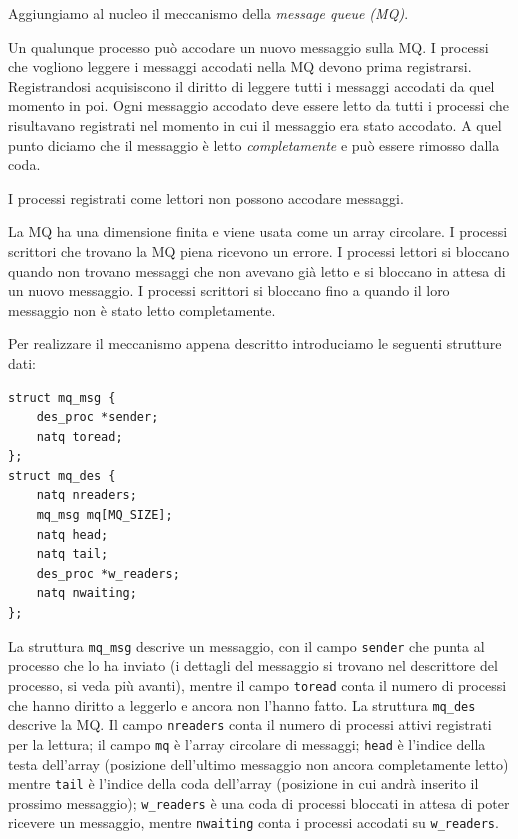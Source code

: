 Aggiungiamo al nucleo il meccanismo della {\em message queue (MQ)}.

Un qualunque processo pu\`o accodare un nuovo messaggio sulla MQ. I processi
che vogliono leggere i messaggi accodati nella MQ devono prima registrarsi.
Registrandosi acquisiscono il diritto di leggere tutti i messaggi accodati
da quel momento in poi.
Ogni messaggio accodato deve essere letto da tutti i processi che risultavano
registrati nel momento in cui il messaggio era stato accodato. A quel punto
diciamo che il messaggio \`e letto {\em completamente} e pu\`o essere rimosso
dalla coda.

I processi registrati come lettori non possono accodare messaggi.

La MQ ha una dimensione finita e viene usata come un array circolare.
I processi scrittori che trovano la MQ piena ricevono un errore.
I processi lettori si bloccano quando non trovano messaggi che non avevano gi\`a letto e si bloccano
in attesa di un nuovo messaggio. I processi scrittori si bloccano fino a quando il loro
messaggio non \`e stato letto completamente.

Per realizzare il meccanismo appena descritto introduciamo le seguenti strutture dati:
\begin{verbatim}
struct mq_msg {
    des_proc *sender;
    natq toread;
};
struct mq_des {
    natq nreaders;
    mq_msg mq[MQ_SIZE];
    natq head;
    natq tail;
    des_proc *w_readers;
    natq nwaiting;
};
\end{verbatim}
La struttura \verb|mq_msg| descrive un messaggio, con il campo \verb|sender| che punta
al processo che lo ha inviato (i dettagli del messaggio si trovano nel descrittore del processo,
si veda pi\`u avanti),
mentre il campo \verb|toread| conta il numero di processi che hanno diritto a leggerlo
e ancora non l'hanno fatto.
La struttura \verb|mq_des| descrive la MQ\@.
Il campo \verb|nreaders| conta il numero di processi attivi registrati per la lettura;
il campo \verb|mq| \`e l'array circolare di messaggi; \verb|head| \`e l'indice della testa
dell'array (posizione dell'ultimo messaggio non ancora completamente letto) mentre \verb|tail|
\`e l'indice della coda dell'array (posizione in cui andr\`a inserito il prossimo messaggio);
\verb|w_readers| \`e una coda di processi bloccati in attesa di poter ricevere un messaggio,
mentre \verb|nwaiting| conta i processi accodati su \verb|w_readers|.

